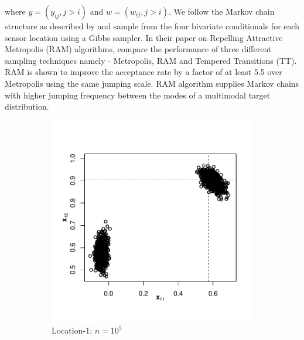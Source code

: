 \documentclass[11pt]{article}
\theoremstyle{remark}
\begin{document}
where $y = (y_{ij}, j>i)$ and $w = (w_{ij}, j>i)$. We follow the Markov chain structure as described by \cite{tak2018repelling} and sample from the four bivariate conditionals for each sensor location using a Gibbs sampler. In their paper on Repelling Attractive Metropolis (RAM) algorithms, \cite{tak2018repelling} compare the performance of three different sampling techniques namely - Metropolis, RAM and Tempered Transitions (TT). RAM is shown to improve the acceptance rate by a factor of at least 5.5 over Metropolis using the same jumping scale. RAM algorithm supplies Markov chains with higher jumping frequency between the modes of a multimodal target distribution.\\

\begin{figure}[h]
    \centering
    \begin{subfigure}[h]{0.4\textwidth}
      \centering
      \includegraphics[width = \textwidth]{plots/sensor-sp_loc1.pdf}
      \caption{Location-1; $n=10^5$}
      \label{subfig:sensor-sp_loc1}
    \end{subfigure}
    \begin{subfigure}[h]{0.5\textwidth}
      \centering

\end{subfigure}
\end{figure}
\end{document}
